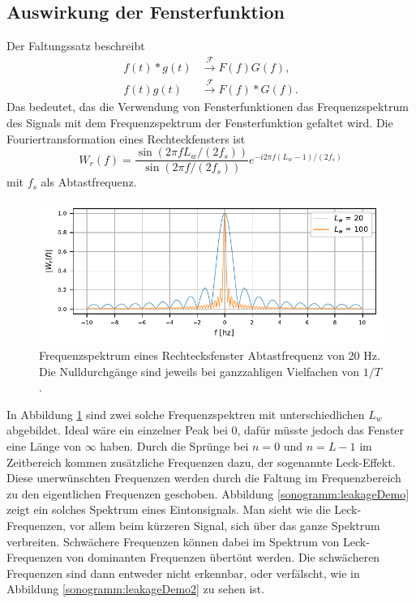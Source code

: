 \subsection{Auswirkung der Fensterfunktion}
Der Faltungssatz beschreibt 
\begin{align}
    f(t) * g(t)& \xrightarrow{\mathscr{F}} F(f)G(f),\\
    f(t) g(t)&\xrightarrow{\mathscr{F}}F(f) * G(f).
\end{align}
Das bedeutet, das die Verwendung von Fensterfunktionen das Frequenzspektrum
des Signals mit dem Frequenzspektrum der Fensterfunktion gefaltet wird.
Die Fouriertransformation eines Rechteckfensters ist 
\begin{equation}
    W_r(f) = \frac{\sin(2 \pi f  L_w / (2 f_s))}{\sin(2 \pi f / (2 f_s))} e^{-i 2 \pi f (L_w-1)/(2f_s)}
\end{equation}
mit $f_s$ als Abtastfrequenz.
\begin{figure}
    \centering
    \includegraphics{papers/sonogramm/images/rect_freq.pdf}
    \caption{Frequenzspektrum eines Rechtecksfenster Abtastfrequenz von 20 Hz. Die Nulldurchgänge sind jeweils bei ganzzahligen Vielfachen
    von $1/T$.
    \label{sonogramm:rectfreq}
    }
\end{figure}
In Abbildung \ref{sonogramm:rectfreq} sind zwei solche Frequenzspektren mit unterschiedlichen $L_w$ abgebildet.
Ideal wäre ein einzelner Peak bei 0, dafür müsste jedoch das Fenster eine Länge von $\infty$ haben.
Durch die Sprünge bei $n = 0$ und $n = L-1$ im Zeitbereich kommen zusätzliche Frequenzen dazu, der sogenannte
Leck-Effekt.
Diese unerwünschten Frequenzen werden durch die Faltung im Frequenzbereich zu den eigentlichen Frequenzen 
geschoben.
Abbildung \ref{sonogramm:leakageDemo} zeigt ein solches Spektrum eines Eintonsignals.
Man sieht wie die Leck-Frequenzen, vor allem beim kürzeren Signal, 
sich über das ganze Spektrum verbreiten.
Schwächere Frequenzen können dabei im Spektrum von Leck-Frequenzen von dominanten Frequenzen
übertönt werden.
Die schwächeren Frequenzen sind dann entweder nicht erkennbar, oder verfälscht, wie in 
Abbildung \ref{sonogramm:leakageDemo2} zu sehen ist.


